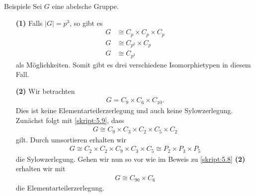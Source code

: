 \begin{genericdf}{Beispiele} \label{skript:5.10}
	Sei $ G $ eine abelsche Gruppe.
	\begin{enumerate}
		\item[\textbf{(1)}]
		Falls $ |G| = p^3 $, so gibt es 
		\begin{align*}
		G &\cong C_p \times C_p \times C_p \\
		G &\cong C_{p^2} \times C_p \\
		G &\cong C_{p^3}
		\end{align*}
		als Möglichkeiten. Somit gibt es drei verschiedene Isomorphietypen in diesem Fall.
		
		\item[\textbf{(2)}] 
		Wir betrachten
		\begin{align*}
		G = C_9 \times C_6 \times C_{10}.
		\end{align*}
		Dies ist keine Elementarteilerzerlegung und auch keine Sylowzerlegung. Zunächst folgt mit \ref{skript:5.9}, dass
		\begin{align*}
		G \cong C_9 \times C_3 \times C_2 \times C_5 \times C_2
		\end{align*}
		gilt. Durch umsortieren erhalten wir
		\begin{align*}
		G \cong C_2 \times C_2 \times C_9 \times C_3 \times C_5
		\cong P_2 \times P_3 \times P_5
		\end{align*}
		die Sylowzerlegung. Gehen wir nun so vor wie im Beweis zu \ref{skript:5.8} \textbf{(2)} erhalten wir mit
		\begin{align*}
		G \cong C_{90} \times C_6
		\end{align*}
		die Elementarteilerzerlegung.
	\end{enumerate}
 \end{genericdf}



